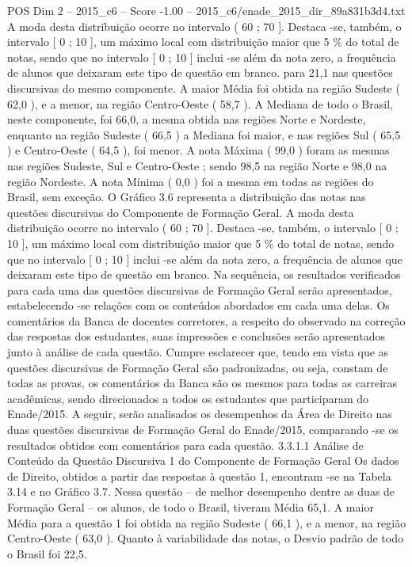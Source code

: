 \begin{textsample}{POS Dim 2 – 2015\_c6 – Score -1.00 – 2015\_c6/enade\_2015\_dir\_89a831b3d4.txt}
A moda desta distribuição ocorre no intervalo ( 60 ; 70 ].
Destaca -se, também, o intervalo [ 0 ; 10 ], um máximo local com distribuição maior que 5 \% do total de notas, sendo que no intervalo [ 0 ; 10 ] inclui -se além da nota zero, a frequência de alunos que deixaram este tipo de questão em branco. para 21,1 nas questões discursivas do mesmo componente.
A maior Média foi obtida na região Sudeste ( 62,0 ), e a menor, na região Centro-Oeste ( 58,7 ).
A Mediana de todo o Brasil, neste componente, foi 66,0, a mesma obtida nas regiões Norte e Nordeste, enquanto na região Sudeste ( 66,5 ) a Mediana foi maior, e nas regiões Sul ( 65,5 ) e Centro-Oeste ( 64,5 ), foi menor.
A nota Máxima ( 99,0 ) foram as mesmas nas regiões Sudeste, Sul e Centro-Oeste ; sendo 98,5 na região Norte e 98,0 na região Nordeste.
A nota Mínima ( 0,0 ) foi a mesma em todas as regiões do Brasil, sem exceção.
O Gráfico 3.6 representa a distribuição das notas nas questões discursivas do Componente de Formação Geral.
A moda desta distribuição ocorre no intervalo ( 60 ; 70 ].
Destaca -se, também, o intervalo [ 0 ; 10 ], um máximo local com distribuição maior que 5 \% do total de notas, sendo que no intervalo [ 0 ; 10 ] inclui -se além da nota zero, a frequência de alunos que deixaram este tipo de questão em branco.
Na sequência, os resultados verificados para cada uma das questões discursivas de Formação Geral serão apresentados, estabelecendo -se relações com os conteúdos abordados em cada uma delas.
Os comentários da Banca de docentes corretores, a respeito do observado na correção das respostas dos estudantes, suas impressões e conclusões serão apresentados junto à análise de cada questão.
Cumpre esclarecer que, tendo em vista que as questões discursivas de Formação Geral são padronizadas, ou seja, constam de todas as provas, os comentários da Banca são os mesmos para todas as carreiras acadêmicas, sendo direcionados a todos os estudantes que participaram do Enade/2015.
A seguir, serão analisados os desempenhos da Área de Direito nas duas questões discursivas de Formação Geral do Enade/2015, comparando -se os resultados obtidos com comentários para cada questão. 3.3.1.1 Análise de Conteúdo da Questão Discursiva 1 do Componente de Formação Geral Os dados de Direito, obtidos a partir das respostas à questão 1, encontram -se na Tabela 3.14 e no Gráfico 3.7.
Nessa questão – de melhor desempenho dentre as duas de Formação Geral – os alunos, de todo o Brasil, tiveram Média 65,1.
A maior Média para a questão 1 foi obtida na região Sudeste ( 66,1 ), e a menor, na região Centro-Oeste ( 63,0 ).
Quanto à variabilidade das notas, o Desvio padrão de todo o Brasil foi 22,5.

\end{textsample}
